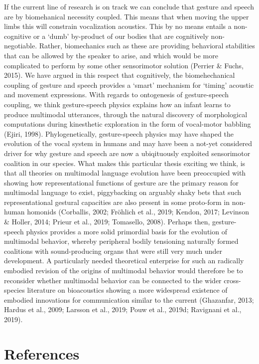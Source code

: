 \documentclass[
  man,floatsintext]{apa6}
\begin{document}
If the current line of research is on track we can conclude that gesture and speech are by biomehanical necessity coupled. This means that when moving the upper limbs this will constrain vocalization acoustics. This by no means entails a non-cognitive or a `dumb' by-product of our bodies that are cognitively non-negotiable. Rather, biomechanics such as these are providing behavioral stabilities that can be allowed by the speaker to arise, and which would be more complicated to perform by some other sensorimotor solution (Perrier \& Fuchs, 2015). We have argued in this respect that cognitively, the biomehechanical coupling of gesture and speech provides a `smart' mechanism for `timing' acoustic and movement expressions. With regards to ontogenesis of gesture-speech coupling, we think gesture-speech physics explains how an infant learns to produce multimodal utterances, through the natural discovery of morphological computations during kinesthetic exploration in the form of vocal-motor babbling (Ejiri, 1998). Phylogenetically, gesture-speech physics may have shaped the evolution of the vocal system in humans and may have been a not-yet considered driver for why gesture and speech are now a ubiqituously exploited sensorimotor coalition in our species. What makes this particular thesis exciting we think, is that all theories on multimodal language evolution have been preoccupied with showing how representational functions of gesture are the primary reason for multimodal language to exist, piggybacking on arguably shaky bets that such representational gestural capacities are also present in some proto-form in non-human homonids (Corballis, 2002; Fröhlich et al., 2019; Kendon, 2017; Levinson \& Holler, 2014; Prieur et al., 2019; Tomasello, 2008). Perhaps then, gesture-speech physics provides a more solid primordial basis for the evolution of multimodal behavior, whereby peripheral bodily tensioning naturally formed coalitions with sound-producing organs that were still very much under development. A particularly needed theoretical enterprise for such an radically embodied revision of the origins of multimodal behavior would therefore be to reconsider whether multimodal behavior can be connected to the wider cross-species literature on bioacoustics showing a more widespread existence of embodied innovations for communication similar to the current (Ghazanfar, 2013; Hardus et al., 2009; Larsson et al., 2019; Pouw et al., 2019d; Ravignani et al., 2019).
\newpage

\hypertarget{references}{%
\section{References}\label{references}}
\end{document}
